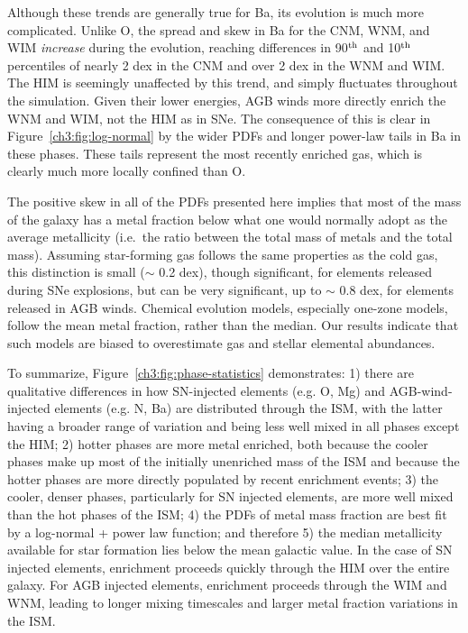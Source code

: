 
Although these trends are generally true for Ba, its evolution is much more complicated.
Unlike O, the spread and skew in Ba for the CNM, WNM, and WIM \textit{increase} during the evolution, reaching differences in 90$^{\rm th}$ and 10$^{\rm th}$ percentiles of nearly 2 dex in the CNM and over 2 dex in the WNM and WIM. The HIM is seemingly unaffected by this trend, and simply fluctuates throughout the simulation. Given their lower energies, AGB winds more directly enrich the WNM and WIM, not the HIM as in SNe. The consequence of this is clear in Figure~\ref{ch3:fig:log-normal} by the wider PDFs and longer power-law tails in Ba in these phases. These tails represent the most recently enriched gas,
        which
is clearly much more locally confined than O.

The positive skew in all of the PDFs presented here implies that most of the mass of the galaxy has a metal fraction below what one would normally adopt as the average metallicity (i.e.\ the ratio between the total mass of metals and the total mass). Assuming star-forming gas follows the same properties as the cold gas, this distinction is small ($\sim$ 0.2 dex),
   though
significant, for elements released during SNe explosions, but can be very significant, up to $\sim$ 0.8 dex, for elements released in AGB winds. Chemical evolution models, especially one-zone models, follow the mean metal fraction, rather than the median.
            Our results indicate that such
models are biased to overestimate gas and stellar elemental abundances.

To summarize, Figure~\ref{ch3:fig:phase-statistics} demonstrates: 1) there are qualitative differences in how SN-injected elements (e.g. O, Mg) and AGB-wind-injected elements (e.g. N, Ba) are distributed through the ISM, with the latter having a broader range of variation and being less well mixed in all phases except the HIM; 2) hotter phases are more metal enriched, both because the cooler phases make up most of the initially unenriched mass of the ISM and because the hotter phases are more directly populated by recent enrichment events; 3) the cooler, denser phases, particularly for SN injected elements, are more well mixed than the hot phases of the ISM; 4) the PDFs of metal mass fraction are best fit by a log-normal + power law function; and therefore 5) the median metallicity available for star formation
lies below the mean galactic value. In the case of SN injected elements, enrichment proceeds quickly through the HIM over the entire galaxy. For AGB injected elements, enrichment proceeds through the WIM and WNM, leading to longer mixing timescales and larger metal fraction variations in the ISM.

